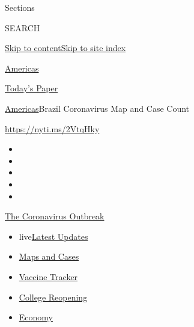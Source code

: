 Sections

SEARCH

\protect\hyperlink{site-content}{Skip to
content}\protect\hyperlink{site-index}{Skip to site index}

\href{https://www.nytimes.com/section/world/americas}{Americas}

\href{https://myaccount.nytimes.com/auth/login?response_type=cookie\&client_id=vi}{}

\href{https://www.nytimes.com/section/todayspaper}{Today's Paper}

\href{/section/world/americas}{Americas}\textbar{}Brazil Coronavirus Map
and Case Count

\url{https://nyti.ms/2VtqHky}

\begin{itemize}
\item
\item
\item
\item
\item
\end{itemize}

\href{https://www.nytimes.com/news-event/coronavirus?action=click\&pgtype=Article\&state=default\&region=TOP_BANNER\&context=storylines_menu}{The
Coronavirus Outbreak}

\begin{itemize}
\tightlist
\item
  live\href{https://www.nytimes.com/2020/08/04/world/coronavirus-cases.html?action=click\&pgtype=Article\&state=default\&region=TOP_BANNER\&context=storylines_menu}{Latest
  Updates}
\item
  \href{https://www.nytimes.com/interactive/2020/us/coronavirus-us-cases.html?action=click\&pgtype=Article\&state=default\&region=TOP_BANNER\&context=storylines_menu}{Maps
  and Cases}
\item
  \href{https://www.nytimes.com/interactive/2020/science/coronavirus-vaccine-tracker.html?action=click\&pgtype=Article\&state=default\&region=TOP_BANNER\&context=storylines_menu}{Vaccine
  Tracker}
\item
  \href{https://www.nytimes.com/2020/08/02/us/covid-college-reopening.html?action=click\&pgtype=Article\&state=default\&region=TOP_BANNER\&context=storylines_menu}{College
  Reopening}
\item
  \href{https://www.nytimes.com/live/2020/08/04/business/stock-market-today-coronavirus?action=click\&pgtype=Article\&state=default\&region=TOP_BANNER\&context=storylines_menu}{Economy}
\end{itemize}

